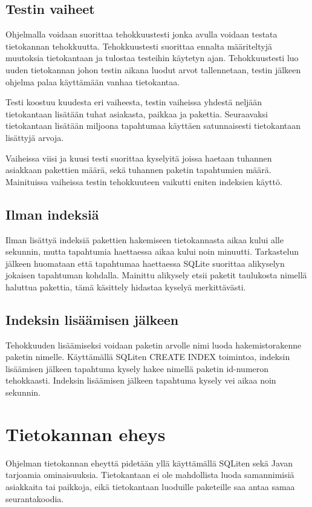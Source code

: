 \documentclass[11pt,a4paper]{article}
\begin{document}
\subsection{Testin vaiheet}
Ohjelmalla voidaan suorittaa tehokkuustesti jonka avulla voidaan testata tietokannan tehokkuutta. Tehokkuustesti suorittaa ennalta määriteltyjä muutoksia tietokantaan ja tulostaa testeihin käytetyn ajan. Tehokkuustesti luo uuden tietokannan johon testin aikana luodut arvot tallennetaan, testin jälkeen ohjelma palaa käyttämään vanhaa tietokantaa.

Testi koostuu kuudesta eri vaiheesta, testin vaiheissa yhdestä neljään tietokantaan lisätään tuhat asiakasta, paikkaa ja pakettia. Seuraavaksi tietokantaan lisätään miljoona tapahtumaa käyttäen satunnaisesti tietokantaan lisättyjä arvoja.

Vaiheissa viisi ja kuusi testi suorittaa kyselyitä joissa haetaan tuhannen asiakkaan pakettien määrä, sekä tuhannen paketin tapahtumien määrä. Mainituissa vaiheissa testin tehokkuuteen vaikutti eniten indeksien käyttö.


\subsection{Ilman indeksiä}
Ilman lisättyä indeksiä pakettien hakemiseen tietokannasta aikaa kului alle sekunnin, mutta tapahtumia haettaessa aikaa kului noin minuutti. Tarkastelun jälkeen huomataan että tapahtumaa haettaessa SQLite suorittaa alikyselyn jokaisen tapahtuman kohdalla. Mainittu alikysely etsii paketit taulukosta nimellä haluttua pakettia, tämä käsittely hidastaa kyselyä merkittävästi.

\subsection{Indeksin lisäämisen jälkeen}
Tehokkuuden lisäämiseksi voidaan paketin arvolle nimi luoda hakemistorakenne paketin nimelle. Käyttämällä SQLiten CREATE INDEX toimintoa, indeksin lisäämisen jälkeen tapahtuma kysely hakee nimellä paketin id-numeron tehokkaasti. Indeksin lisäämisen jälkeen tapahtuma kysely vei aikaa noin sekunnin.

\newpage
\section{Tietokannan eheys}
Ohjelman tietokannan eheyttä pidetään yllä käyttämällä SQLiten sekä Javan tarjoamia ominaisuuksia. Tietokantaan ei ole mahdollista luoda samannimisiä asiakkaita tai paikkoja, eikä tietokantaan luoduille paketeille saa antaa samaa seurantakoodia.
\end{document}

